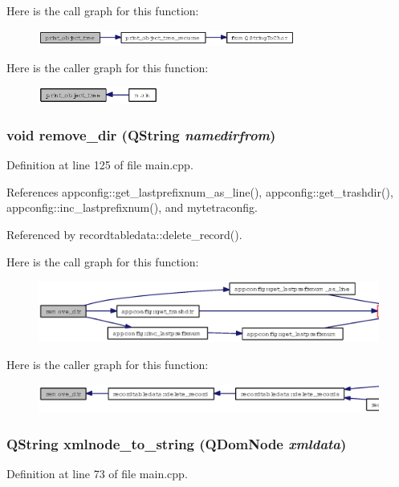 Here is the call graph for this function:\begin{figure}[H]
\begin{center}
\leavevmode
\includegraphics[width=239pt]{main_8h_8ff96661921f7c09201747e09d034951_cgraph}
\end{center}
\end{figure}


Here is the caller graph for this function:\begin{figure}[H]
\begin{center}
\leavevmode
\includegraphics[width=112pt]{main_8h_8ff96661921f7c09201747e09d034951_icgraph}
\end{center}
\end{figure}
\subsubsection{\setlength{\rightskip}{0pt plus 5cm}void remove\_\-dir (QString {\em namedirfrom})}\label{main_8h_6ac3f8d337a3e659a3c1cdfeef1cbaf0}




Definition at line 125 of file main.cpp.

References appconfig::get\_\-lastprefixnum\_\-as\_\-line(), appconfig::get\_\-trashdir(), appconfig::inc\_\-lastprefixnum(), and mytetraconfig.

Referenced by recordtabledata::delete\_\-record().

Here is the call graph for this function:\begin{figure}[H]
\begin{center}
\leavevmode
\includegraphics[width=373pt]{main_8h_6ac3f8d337a3e659a3c1cdfeef1cbaf0_cgraph}
\end{center}
\end{figure}


Here is the caller graph for this function:\begin{figure}[H]
\begin{center}
\leavevmode
\includegraphics[width=384pt]{main_8h_6ac3f8d337a3e659a3c1cdfeef1cbaf0_icgraph}
\end{center}
\end{figure}
\subsubsection{\setlength{\rightskip}{0pt plus 5cm}QString xmlnode\_\-to\_\-string (QDom\-Node {\em xmldata})}\label{main_8h_dbcd54017c14dc5f88b7ff9e17a87706}




Definition at line 73 of file main.cpp.